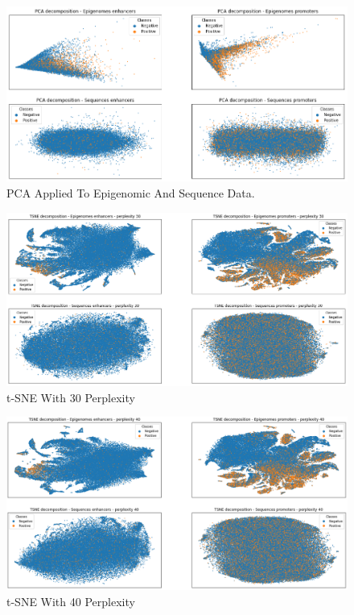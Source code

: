 \documentclass{article}
\begin{document}
\begin{figure}
    \centering
    \includegraphics[width=12cm]{image/PCA_2.png}
    \caption{PCA Applied To Epigenomic And Sequence Data.}
    \label{fig:PCA}
\end{figure}

\begin{figure}
    \centering
    \includegraphics[width=12cm]{image/+30_TSNE.png}
    \caption{t-SNE With 30 Perplexity}
    \label{fig:30_Perplexity}
\end{figure}

\begin{figure}
    \centering
    \includegraphics[width=12cm]{image/+40_TSNE.png}
    \caption{t-SNE With 40 Perplexity}
    \label{fig:40_Perplexity}
\end{figure}
\end{document}
